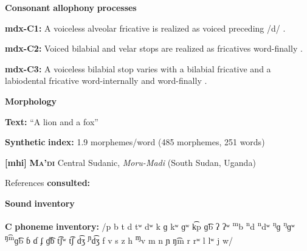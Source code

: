 \documentclass[output=paper]{langsci/langscibook}
\begin{document}
\begin{styleBody}
\textbf{Consonant} \textbf{allophony} \textbf{processes}
\end{styleBody}

\begin{styleBody}
\textbf{mdx-C1:} A voiceless alveolar fricative is realized as voiced preceding /d/ \citep[26]{Beachy2005}.
\end{styleBody}

\begin{styleBody}
\textbf{mdx-C2:} Voiced bilabial and velar stops are realized as fricatives word-finally \citep[17]{Beachy2005}.
\end{styleBody}

\begin{styleBody}
\textbf{mdx-C3:} A voiceless bilabial stop varies with a bilabial fricative and a labiodental fricative word-internally and word-finally \citep[17]{Beachy2005}.
\end{styleBody}

\begin{styleBody}
\textbf{Morphology}
\end{styleBody}

\begin{styleBody}
\textbf{Text:} “A lion and a fox” \citep[154-158]{Beachy2005}
\end{styleBody}

\begin{styleBody}
\textbf{Synthetic} \textbf{index:} 1.9 morphemes/word (485 morphemes, 251 words)
\end{styleBody}

\begin{styleBody}
\textbf{[mhi]}   \textbf{\textsc{Ma’di}}  Central Sudanic, \textit{Moru-Madi} (South Sudan, Uganda)
\end{styleBody}

\begin{styleBody}
References \textbf{consulted:} \citet{BlackingsFabb2003}
\end{styleBody}

\begin{styleBody}
\textbf{Sound} \textbf{inventory}
\end{styleBody}

\begin{styleBody}
\textbf{C} \textbf{phoneme} \textbf{inventory:} /p b t d tʷ dʷ k ɡ kʷ ɡʷ k͡p ɡ͡b ʔ ʔʷ \textsuperscript{m}b \textsuperscript{n}d \textsuperscript{n}dʷ \textsuperscript{ŋ}ɡ \textsuperscript{ŋ}ɡʷ \textsuperscript{ŋ͡m}ɡ͡b ɓ ɗ ʄ ɠ͡ɓ t͡ʃʷ t͡ʃ d͡ʒ \textsuperscript{ɲ}d͡ʒ f v s z h \textsuperscript{ɱ}v m n ɲ ŋ͡m r rʷ l lʷ j w/
\end{styleBody}
\end{document}
